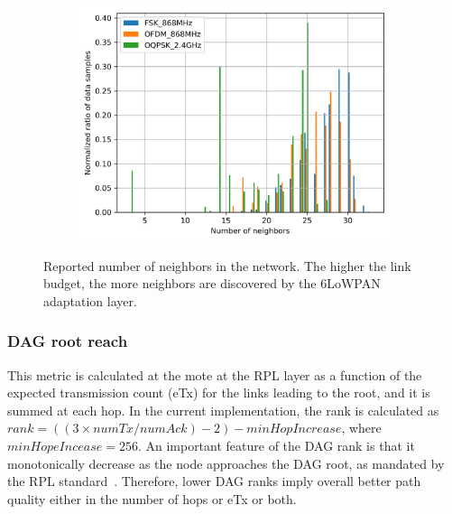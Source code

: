 \documentclass[sensors,article,submit,moreauthors,pdftex]{Definitions/mdpi}
\begin{document}
\begin{figure}
	\begin{subfigure}{0.49\columnwidth}
		\centering
    	\includegraphics[width=1.00\columnwidth]{neighbors_pdf}
    	\label{fig:neighbors_pdf}
	\end{subfigure}
	\caption{
	    Reported number of neighbors in the network.
	    The higher the link budget, the more neighbors are discovered by the 6LoWPAN adaptation layer.
	} 
	\label{fig:neighbors_all}
\end{figure}

\subsubsection{DAG root reach}
\label{sec:dagroot}


This metric is calculated at the mote at the RPL layer as a function of the expected transmission count (eTx) for the links leading to the root, and it is summed at each hop.
In the current implementation, the rank is calculated as $rank = ((3\times numTx/numAck)-2)-minHopIncrease$, where $minHopeIncease = 256$. 
An important feature of the DAG rank is that it monotonically decrease as  the node approaches the DAG root, as mandated by the RPL standard~\cite{rfc6550}.
Therefore, lower DAG ranks imply overall better path quality either in the number of hops or eTx or both. 

\end{document}
